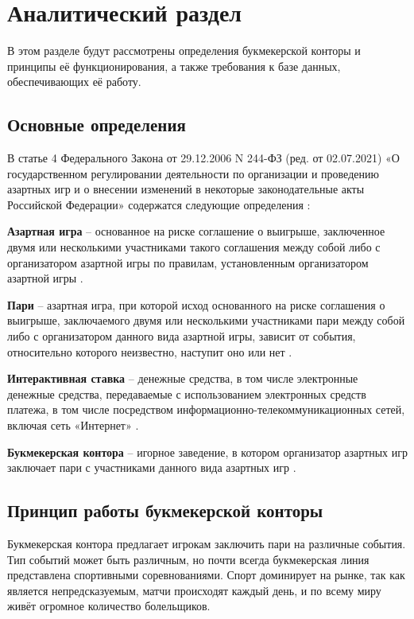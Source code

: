 \section{Аналитический раздел}
В этом разделе будут рассмотрены определения букмекерской конторы и принципы её функционирования, а также требования к базе данных, обеспечивающих её работу.

\subsection{Основные определения}
В статье 4 Федерального Закона от 29.12.2006 N 244-ФЗ (ред. от 02.07.2021) «О государственном регулировании деятельности по организации и проведению азартных игр и о внесении изменений в некоторые законодательные акты Российской Федерации» содержатся следующие определения \cite{bk}:

\textbf{Азартная игра} -- основанное на риске соглашение о выигрыше, заключенное двумя или несколькими участниками такого соглашения между собой либо с организатором азартной игры по правилам, установленным организатором азартной игры \cite{bk}.

\textbf{Пари} -- азартная игра, при которой исход основанного на риске соглашения о выигрыше, заключаемого двумя или несколькими участниками пари между собой либо с организатором данного вида азартной игры, зависит от события, относительно которого неизвестно, наступит оно или нет \cite{bk}.

\textbf{Интерактивная ставка} -- денежные средства, в том числе электронные денежные средства, передаваемые с использованием электронных средств платежа, в том числе посредством информационно-телекоммуникационных сетей, включая сеть «Интернет» \cite{bk}.

\textbf{Букмекерская контора} -- игорное заведение, в котором организатор азартных игр заключает пари с участниками данного вида азартных игр \cite{bk}.

\subsection{Принцип работы букмекерской конторы}
Букмекерская контора предлагает игрокам заключить пари на различные события. 
Тип событий может быть различным, но почти всегда букмекерская линия представлена спортивными соревнованиями.
Спорт доминирует на рынке, так как является непредсказуемым, матчи происходят каждый день, и по всему миру живёт огромное количество болельщиков.

